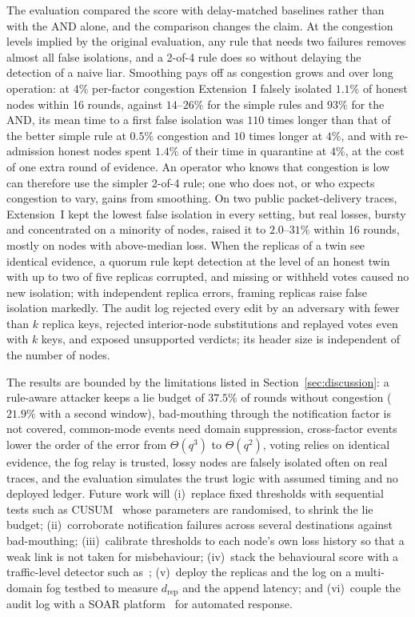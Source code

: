 \documentclass{ieeeaccess}
\begin{document}
The evaluation compared the score with delay-matched baselines rather
than with the AND alone, and the comparison changes the claim.  At the
congestion levels implied by the original evaluation, any rule that
needs two failures removes almost all false isolations, and a
2-of-4 rule does so without delaying the detection of a naive liar.  Smoothing pays off as
congestion grows and over long operation: at $4\%$ per-factor
congestion Extension~I falsely isolated $1.1\%$ of honest nodes within
16 rounds, against $14$--$26\%$ for the simple rules and $93\%$ for the
AND, its mean time to a first false isolation was $110$ times longer
than that of the better simple rule at $0.5\%$ congestion and $10$
times longer at $4\%$, and with re-admission honest nodes spent
$1.4\%$ of their time in quarantine at $4\%$,
at the cost of one extra round of evidence.  An operator who knows
that congestion is low can therefore use the simpler 2-of-4 rule; one
who does not, or who expects congestion to vary, gains from
smoothing.  On two public packet-delivery traces, Extension~I kept the
lowest false isolation in every setting, but real losses, bursty and
concentrated on a minority of nodes, raised it to $2.0$--$31\%$ within
16 rounds, mostly on nodes with above-median loss.  When the replicas of a twin see identical evidence, a quorum rule
kept detection at the level of an honest twin with up to two of five
replicas corrupted, and missing or withheld votes caused no new
isolation; with independent replica errors, framing replicas raise
false isolation markedly.  The audit log rejected every edit by an
adversary with fewer than $k$ replica keys, rejected interior-node
substitutions and replayed votes even with $k$ keys, and exposed
unsupported verdicts; its header size is independent of the number of
nodes.

The results are bounded by the limitations listed in
Section~\ref{sec:discussion}: a rule-aware attacker keeps a lie budget
of $37.5\%$ of rounds without congestion ($21.9\%$ with a second
window), bad-mouthing through the notification factor is not covered,
common-mode events need domain suppression, cross-factor events lower
the order of the error from $\Theta(q^{3})$ to $\Theta(q^{2})$,
voting relies on identical evidence, the fog relay is trusted, lossy
nodes are falsely isolated often on real traces, and the evaluation
simulates the trust logic with assumed timing and no deployed ledger.  Future work will
(i)~replace fixed thresholds with sequential tests such as
CUSUM~\cite{page1954continuous} whose parameters are randomised, to
shrink the lie budget; (ii)~corroborate notification failures across
several destinations against bad-mouthing; (iii)~calibrate thresholds to each node's own loss history so that
a weak link is not taken for misbehaviour; (iv)~stack the behavioural
score with a traffic-level detector such
as~\cite{meidan2018nbaiot}; (v)~deploy the replicas and the log on a
multi-domain fog testbed to measure $d_{\mathrm{rep}}$ and the append
latency; and (vi)~couple the audit log with a SOAR
platform~\cite{empl2022soar4iot} for automated response.
\end{document}
